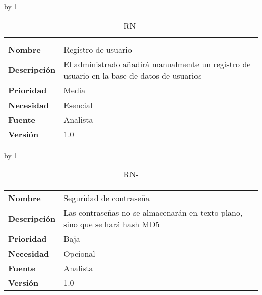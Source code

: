\advance\rn by 1
\begin{table}[H]
	\caption{RN-\number\rn}
	\begin{tabular}{|l|p{}|}
		\hline
		\multicolumn{2}{|c|}{\cellcolor[HTML]{BFBFBF}{\color[HTML]{000000} \textbf{RN-\number\rn}}} \\ \hline
		\textbf{Nombre}      & Registro de usuario                                                                        \\ \hline
		\textbf{Descripción} & El administrado añadirá manualmente un registro de usuario en la base de datos de usuarios \\ \hline
		\textbf{Prioridad}   & Media                                                                                      \\ \hline
		\textbf{Necesidad}   & Esencial                                                                                   \\ \hline
		\textbf{Fuente}      & Analista                                                                                   \\ \hline
		\textbf{Versión}     & 1.0                                                                                        \\ \hline
	\end{tabular}
\end{table}
\advance\rn by 1
\begin{table}[H]
	\caption{RN-\number\rn}
	\begin{tabular}{|l|p{}|}
		\hline
		\multicolumn{2}{|c|}{\cellcolor[HTML]{BFBFBF}{\color[HTML]{000000} \textbf{RN-\number\rn}}} \\ \hline
		\textbf{Nombre}      & Seguridad de contraseña                                                      \\ \hline
		\textbf{Descripción} & Las contraseñas no se almacenarán en texto plano, sino que se hará  hash MD5 \\ \hline
		\textbf{Prioridad}   & Baja                                                                         \\ \hline
		\textbf{Necesidad}   & Opcional                                                                     \\ \hline
		\textbf{Fuente}      & Analista                                                                     \\ \hline
		\textbf{Versión}     & 1.0                                                                          \\ \hline
	\end{tabular}
\end{table}
